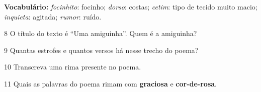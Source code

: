 \begin{myquote}

\begin{small}
\textbf{Vocabulário:} \textit{focinhito}: focinho; \textit{dorso}: costas; \textit{cetim}: tipo de tecido muito macio; \textit{inquieta}: agitada; \textit{rumor}: ruído.
\end{small}
\end{myquote}

\num{8} O título do texto é ``Uma amiguinha''. Quem é a amiguinha?


\num{9} Quantas estrofes e quantos versos há nesse trecho do poema?


\num{10} Transcreva uma rima presente no poema.


\num{11} Quais as palavras do poema rimam com \textbf{graciosa} e \textbf{cor-de-rosa}.

